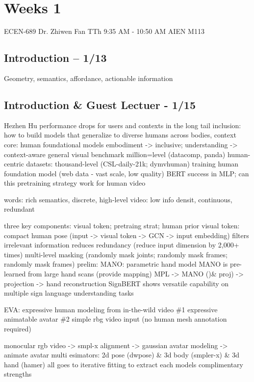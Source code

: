 \documentclass[11pt, oneside]{book}
\begin{document}
\chapter{Weeks 1}

ECEN-689
Dr. Zhiwen Fan
TTh 9:35 AM - 10:50 AM
AIEN M113

\section{Introduction -- 1/13}

Geometry, semantics, affordance, actionable information

\section{Introduction \& Guest Lectuer - 1/15}

Hezhen Hu
performance drops for users and contexts in the long tail
inclusion: how to build models that generalize to diverse humans across bodies, context
core: human foundational models
embodiment -> inclusive; understanding -> context-aware
general visual benchmark million=level (datacomp, panda)
human-centric datasets: thousand-level (CSL-daily-21k; dymvhuman)
training human foundation model (web data - vast scale, low quality)
BERT success in MLP; can this pretraining strategy work for human video

words: rich semantics, discrete, high-level
video: low info densit, continuous, redundant

three key components: visual token; pretraing strat; human prior
visual token: compact human pose (input -> visual token -> GCN -> input embedding)
filters irrelevant information
reduces redundancy (reduce input dimension by 2,000+ times)
multi-level masking (randomly mask joints; randomly mask frames; randomly mask frames)
prelim: MANO: parametric hand model
MANO is pre-learned from large hand scans (provide mapping)
MPL -> MANO ()\& proj) -> projection -> hand reconstruction
SignBERT shows versatile capability on multiple sign language understanding tasks

EVA: expressive human modeling from in-the-wild video
\#1 expressive animatable avatar
\#2 simple rbg video input (no human mesh annotation required)

monocular rgb video -> smpl-x alignment -> gaussian avatar modeling -> animate avatar
multi esimators: 2d pose (dwpose) \& 3d body (smpler-x) \& 3d hand (hamer)
all goes to iterative fitting to extract each models complimentary strengths
\end{document}
